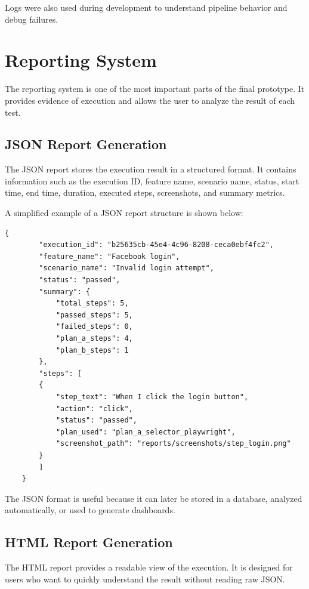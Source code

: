 Logs were also used during development to understand pipeline behavior and debug failures.

\section{Reporting System}
\label{sec:reporting_system}

The reporting system is one of the most important parts of the final prototype. It provides evidence of execution and allows the user to analyze the result of each test.

\subsection{JSON Report Generation}
\label{subsec:json_report_generation}

The JSON report stores the execution result in a structured format. It contains information such as the execution ID, feature name, scenario name, status, start time, end time, duration, executed steps, screenshots, and summary metrics.

A simplified example of a JSON report structure is shown below:

\begin{lstlisting}[caption={Simplified JSON report structure}, label={lst:json_report_structure}]
	{
		"execution_id": "b25635cb-45e4-4c96-8208-ceca0ebf4fc2",
		"feature_name": "Facebook login",
		"scenario_name": "Invalid login attempt",
		"status": "passed",
		"summary": {
			"total_steps": 5,
			"passed_steps": 5,
			"failed_steps": 0,
			"plan_a_steps": 4,
			"plan_b_steps": 1
		},
		"steps": [
		{
			"step_text": "When I click the login button",
			"action": "click",
			"status": "passed",
			"plan_used": "plan_a_selector_playwright",
			"screenshot_path": "reports/screenshots/step_login.png"
		}
		]
	}
\end{lstlisting}

The JSON format is useful because it can later be stored in a database, analyzed automatically, or used to generate dashboards.

\subsection{HTML Report Generation}
\label{subsec:html_report_generation}

The HTML report provides a readable view of the execution. It is designed for users who want to quickly understand the result without reading raw JSON.

